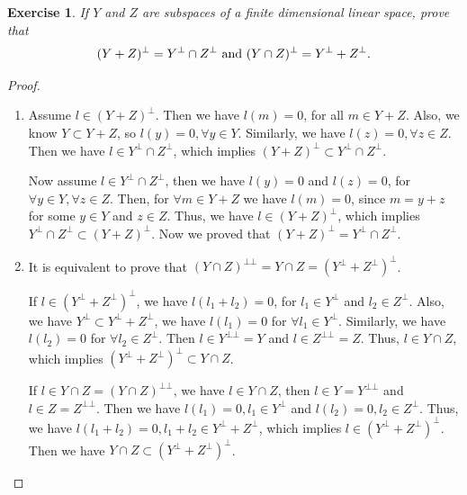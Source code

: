 \documentclass[11pt]{book}
\newtheorem{exercise}{Exercise}[section]
\theoremstyle{definition}
\numberwithin{equation}{chapter}
\begin{document}
\begin{exercise}
If $Y$ and $Z$ are subspaces of a finite dimensional linear space, prove that 
\begin{align*}
    (Y + Z)^\bot = Y^\bot \cap Z^\bot\,\,{\rm and}\,\, (Y \cap Z)^\bot = Y^\bot + Z^\bot.
\end{align*}
\end{exercise}
\begin{proof}
~\begin{enumerate}[label=(\alph*)]
    \item Assume $l \in (Y+Z)^\bot$. Then we have $l(m) = 0$, for all $m \in Y+Z$. Also, we know $Y\subset Y+Z$, so $l(y) = 0, \forall y \in Y$. Similarly, we have $l(z) = 0, \forall z \in Z$. Then we have $l \in Y^\bot \cap Z^\bot$, which implies $(Y+Z)^\bot \subset Y^\bot \cap Z^\bot$.
    
    Now assume $l \in Y^\bot \cap Z^\bot$, then we have $l(y) = 0$ and $l(z) = 0$, for $\forall y \in Y, \forall z \in Z$. Then, for $\forall m \in Y+Z$ we have $l(m) = 0$, since $m = y + z$ for some $y \in Y$ and $z \in Z$. Thus, we have $l \in (Y+Z)^\bot$, which implies $Y^\bot \cap Z^\bot \subset (Y+Z)^\bot$. Now we proved that $(Y+Z)^\bot = Y^\bot \cap Z^\bot$.
    \item It is equivalent to prove that $(Y \cap Z)^{\bot\bot} = Y\cap Z = (Y^\bot + Z^\bot)^\bot$.
    
    
    If $l \in (Y^\bot + Z^\bot)^\bot$, we have $l(l_1 + l_2) = 0$, for $l_1 \in Y^\bot$ and $l_2 \in Z^\bot$. Also, we have $Y^\bot \subset Y^\bot + Z^\bot$, we have $l(l_1) = 0$ for $\forall l_1 \in Y^\bot$. Similarly, we have $l(l_2) = 0$ for $\forall l_2 \in Z^\bot$. Then $l \in Y^{\bot\bot} = Y$ and $l \in Z^{\bot\bot} = Z$. Thus, $l \in Y\cap Z$, which implies $(Y^\bot + Z^\bot)^\bot \subset Y\cap Z$.
    
    
    If $l \in Y\cap Z = (Y\cap Z)^{\bot\bot}$, we have $l \in Y\cap Z$, then $l \in Y = Y^{\bot\bot}$ and $l \in Z = Z^{\bot\bot}$. Then we have $l(l_1) = 0, l_1 \in Y^\bot$ and $l(l_2) = 0, l_2 \in Z^\bot$. Thus, we have $l(l_1 + l_2) = 0, l_1 + l_2 \in Y^\bot + Z^\bot$, which implies $l \in (Y^\bot + Z^\bot)^\bot$. Then we have $Y\cap Z \subset (Y^\bot + Z^\bot)^\bot$.
\end{enumerate}
\end{proof}

\medskip
\end{document}

